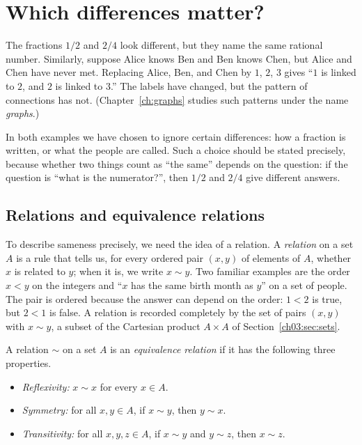 \section{Which differences matter?}\label{ch06:sec:differences}
The fractions $1/2$ and $2/4$ look different, but they name the same rational number. Similarly, suppose Alice knows Ben and Ben knows Chen, but Alice and Chen have never met. Replacing Alice, Ben, and Chen by $1$, $2$, $3$ gives ``$1$ is linked to $2$, and $2$ is linked to $3$.'' The labels have changed, but the pattern of connections has not. (Chapter~\ref{ch:graphs} studies such patterns under the name \emph{graphs}.)

In both examples we have chosen to ignore certain differences: how a fraction is written, or what the people are called. Such a choice should be stated precisely, because whether two things count as ``the same'' depends on the question: if the question is ``what is the numerator?'', then $1/2$ and $2/4$ give different answers.

\subsection*{Relations and equivalence relations}
To describe sameness precisely, we need the idea of a relation. A \emph{relation} on a set $A$ is a rule that tells us, for every ordered pair $(x,y)$ of elements of $A$, whether $x$ is related to $y$; when it is, we write $x\sim y$. Two familiar examples are the order $x<y$ on the integers and ``$x$ has the same birth month as $y$'' on a set of people. The pair is ordered because the answer can depend on the order: $1<2$ is true, but $2<1$ is false. A relation is recorded completely by the set of pairs $(x,y)$ with $x\sim y$, a subset of the Cartesian product $A\times A$ of Section~\ref{ch03:sec:sets}.

\par\noindent\begin{minipage}{\linewidth}
\begin{definition}\label{ch06:def:equivalence}
A relation $\sim$ on a set $A$ is an \emph{equivalence relation} if it has the following three properties.
\begin{itemize}
\item \emph{Reflexivity:} $x\sim x$ for every $x\in A$.
\item \emph{Symmetry:} for all $x,y\in A$, if $x\sim y$, then $y\sim x$.
\item \emph{Transitivity:} for all $x,y,z\in A$, if $x\sim y$ and $y\sim z$, then $x\sim z$.
\end{itemize}
\end{definition}
\end{minipage}\par

